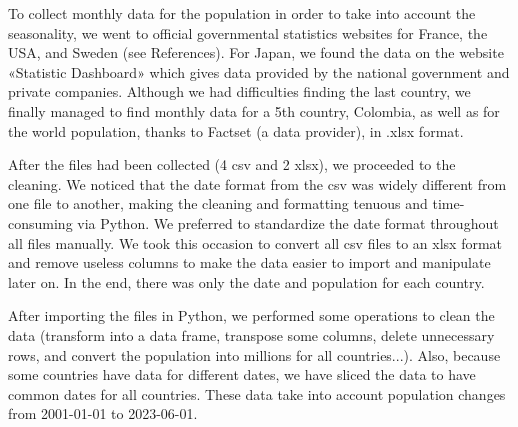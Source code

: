 \documentclass[hidelinks,11pts]{article}
\DeclareMathOperator{\1}{\mathbbm{1}}
\begin{document}
To collect monthly data for the population in order to take into account the seasonality, we went to official governmental statistics websites for France, the USA, and Sweden (see References).
For Japan, we found the data on the website «Statistic Dashboard» which gives data provided by the national government and private companies. 
Although we had difficulties finding the last country, we finally managed to find monthly data for a 5th country, Colombia, as well as for the world population, thanks to Factset (a data provider), in .xlsx format. 

After the files had been collected (4 csv and 2 xlsx), we proceeded to the cleaning. We noticed that the date format from the csv was widely different from one file to another, making the cleaning and formatting tenuous and time-consuming via Python. We preferred to standardize the date format throughout all files manually. We took this occasion to convert all csv files to an xlsx format and remove useless columns to make the data easier to import and manipulate later on. 
In the end, there was only the date and population for each country. 

After importing the files in Python, we performed some operations to clean the data (transform into a data frame, transpose some columns, delete unnecessary rows, and convert the population into millions for all countries...). Also, because some countries have data for different dates, we have sliced the data to have common dates for all countries. These data take into account population changes from 2001-01-01 to 2023-06-01.

\end{document}
